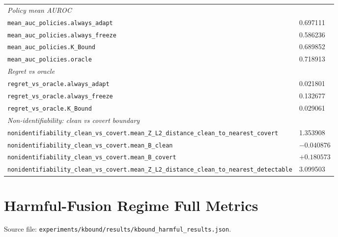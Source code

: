 \begin{table}[ht]
\begin{tabular}{ll}
\midrule
\textit{Policy mean AUROC} & \\
\texttt{mean\_auc\_policies.always\_adapt}  & 0.697111 \\
\texttt{mean\_auc\_policies.always\_freeze} & 0.586236 \\
\texttt{mean\_auc\_policies.K\_Bound}       & 0.689852 \\
\texttt{mean\_auc\_policies.oracle}         & 0.718913 \\
\midrule
\textit{Regret vs oracle} & \\
\texttt{regret\_vs\_oracle.always\_adapt}   & 0.021801 \\
\texttt{regret\_vs\_oracle.always\_freeze}  & 0.132677 \\
\texttt{regret\_vs\_oracle.K\_Bound}        & 0.029061 \\
\midrule
\textit{Non-identifiability: clean vs covert boundary} & \\
\texttt{nonidentifiability\_clean\_vs\_covert.mean\_Z\_L2\_distance\_clean\_to\_nearest\_covert} & 1.353908 \\
\texttt{nonidentifiability\_clean\_vs\_covert.mean\_B\_clean}   & $-0.040876$ \\
\texttt{nonidentifiability\_clean\_vs\_covert.mean\_B\_covert}  & $+0.180573$ \\
\texttt{nonidentifiability\_clean\_vs\_covert.mean\_Z\_L2\_distance\_clean\_to\_nearest\_detectable} & 3.099503 \\
\bottomrule
\end{tabular}
\end{table}

\section{Harmful-Fusion Regime Full Metrics}
\label{sec:app-harmful}

Source file: \texttt{experiments/kbound/results/kbound\_harmful\_results.json}.

